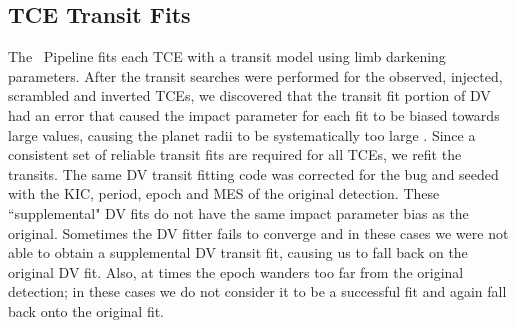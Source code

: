 \subsection{TCE Transit Fits}

The \Kepler\ Pipeline fits each TCE with a \citet{Mandel2002} transit model using \citet{Claret2000} limb darkening parameters. After the transit searches were performed for the observed, injected, scrambled and inverted TCEs, we discovered that the transit fit portion of DV had an error that caused the impact parameter for each fit to be biased towards large values, causing the planet radii to be systematically too large \citep[for further information see][]{Christiansen2017}. Since a consistent set of reliable transit fits are required for all TCEs, we refit the transits.  The same DV transit fitting code was corrected for the bug and seeded with the KIC, period, epoch and MES of the original detection. These ``supplemental" DV fits do not have the same impact parameter bias as the original.  Sometimes the DV fitter fails to converge and in these cases we were not able to obtain a supplemental DV transit fit, causing us to fall back on the original DV fit. Also, at times the epoch wanders too far from the original detection; in these cases we do not consider it to be a successful fit and again fall back onto the original fit.

